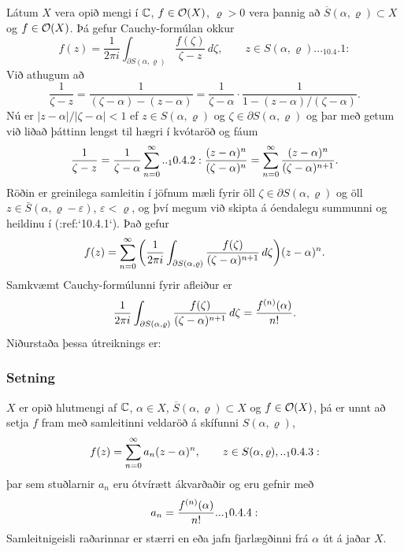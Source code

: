Látum $X$ vera opið mengi í ${\mathbb C}$, $f\in {\cal O}(X)$, $\varrho>0$ vera
þannig að $\overline S(\alpha,\varrho)\subset X$
og $f\in{\cal O}(X)$.  Þá gefur
Cauchy-formúlan okkur
 \begin{equation*}f(z)=\dfrac 1{2\pi i}\int_{\partial S(\alpha,\varrho)}
\dfrac{f(\zeta)}{\zeta-z}\, d\zeta, \qquad z\in S(\alpha,\varrho).


.. _10.4.1:

 \end{equation*}
Við athugum að 
 $$\dfrac 1{\zeta-z}=\dfrac 1{(\zeta-\alpha)-(z-\alpha)}=
\dfrac 1{\zeta-\alpha}\cdot\dfrac 1{1-(z-\alpha)/(\zeta-\alpha)}.
 $$
Nú er $|z-\alpha|/|\zeta-\alpha|<1$ ef $z\in S(\alpha,\varrho)$ og
$\zeta\in\partial S(\alpha,\varrho)$ og þar með getum við liðað
þáttinn lengst til hægri í kvótaröð
og fáum
 \begin{equation*}\dfrac 1{\zeta-z}=\dfrac 1{\zeta-\alpha}\sum_{n=0}\sp \infty

.. _10.4.2:

\dfrac{(z-\alpha)\sp n}{(\zeta-\alpha)\sp n}=\sum_{n=0}\sp \infty
\dfrac{(z-\alpha)\sp n}{(\zeta-\alpha)\sp {n+1}}.
 \end{equation*}
Röðin er greinilega samleitin í jöfnum mæli fyrir öll
$\zeta\in\partial S(\alpha,\varrho)$ og öll $z\in \bar
S(\alpha,\varrho-\varepsilon)$, $\varepsilon<\varrho$, og því megum
við skipta á óendalegu summunni og heildinu í (:ref:`10.4.1`).
Það gefur
 $$
f(z)=\sum_{n=0}\sp \infty \bigg( \dfrac 1{2\pi i}
\int_{\partial S(\alpha,\varrho)}
\dfrac {f(\zeta)}{(\zeta-\alpha)\sp{n+1}}\, d\zeta\bigg)
(z-\alpha)\sp n.
 $$
Samkvæmt Cauchy-formúlunni fyrir afleiður er
 $$\dfrac 1{2\pi i}
\int_{\partial S(\alpha,\varrho)}
\dfrac {f(\zeta)}{(\zeta-\alpha)\sp{n+1}}\, d\zeta=
\dfrac{f\sp{(n)}(\alpha)}{n!}.
 $$
Niðurstaða þessa útreiknings er: 


\subsubsection{Setning} $X$ er opið hlutmengi af ${\mathbb C}$, $\alpha\in X$,
$\overline S(\alpha,\varrho)\subset X$ og $f\in {\cal O}(X)$,
þá er unnt að setja  $f$ fram með samleitinni veldaröð
á skífunni $S(\alpha,\varrho)$,
 \begin{equation*}f(z)=\sum_{n=0}\sp \infty a_n(z-\alpha)\sp n,
\qquad z\in S(\alpha,\varrho),


.. _10.4.3:

 \end{equation*}
þar sem stuðlarnir $a_n$ eru ótvírætt ákvarðaðir og eru gefnir með 
 \begin{equation*}a_n=\dfrac {f\sp{(n)}(\alpha)}{n!}.

.. _10.4.4:

 \end{equation*}
Samleitnigeisli raðarinnar er stærri en eða jafn fjarlægðinni
frá $\alpha$ út á  jaðar $X$.


